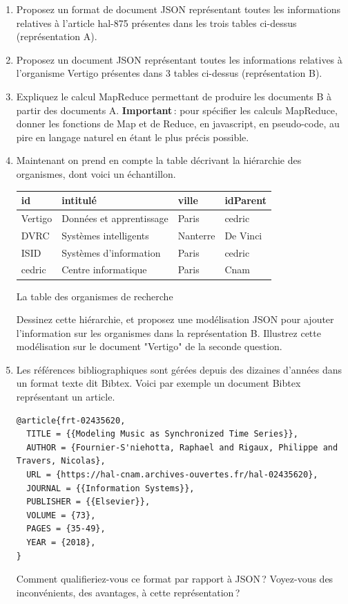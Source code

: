 \documentclass[11pt,a4paper]{article}
\newcommand{\cle}[1]{\textbf{#1}}
\begin{document}
\begin{enumerate}
  \item Proposez un format de document JSON représentant toutes les informations
        relatives à l'article hal-875 présentes dans les trois tables ci-dessus (représentation A).

  \item Proposez un document JSON représentant toutes les
        informations relatives à l'organisme Vertigo présentes dans 3 tables ci-dessus
         (représentation B).

   \item Expliquez le calcul MapReduce permettant de produire les documents
   B à partir des documents A.
   \textbf{Important}\,: pour spécifier les calculs MapReduce, donner les fonctions de Map et de Reduce, en javascript,
en pseudo-code, au pire en langage naturel en étant le plus précis possible.


   \item Maintenant on prend en compte la table décrivant la hiérarchie des organismes,
         dont voici un échantillon.
         \begin{center}
         \begin{tabular}{l|l|l|l}
\cle{id} & intitulé & ville & idParent\\
\hline
Vertigo & Données et apprentissage & Paris & cedric \\
DVRC & Systèmes intelligents & Nanterre & De Vinci \\
ISID & Systèmes d'information & Paris &  cedric\\
cedric & Centre informatique  & Paris &  Cnam\\
\hline
\end{tabular}
\centerline{La table des organismes de recherche}
\end{center}

   Dessinez cette hiérarchie, et proposez une modélisation JSON pour ajouter l'information
   sur les organismes dans la représentation B. Illustrez cette modélisation
   sur le document "Vertigo" de la seconde question.

     \item Les références bibliographiques sont gérées depuis des dizaines d'années dans
       un format texte dit Bibtex. Voici par exemple
       un document Bibtex représentant un article.

\begin{verbatim}
@article{frt-02435620,
  TITLE = {{Modeling Music as Synchronized Time Series}},
  AUTHOR = {Fournier-S'niehotta, Raphael and Rigaux, Philippe and Travers, Nicolas},
  URL = {https://hal-cnam.archives-ouvertes.fr/hal-02435620},
  JOURNAL = {{Information Systems}},
  PUBLISHER = {{Elsevier}},
  VOLUME = {73},
  PAGES = {35-49},
  YEAR = {2018},
}
\end{verbatim}

       Comment qualifieriez-vous ce format par rapport à JSON\,? Voyez-vous
        des inconvénients, des avantages, à cette représentation\,?

\end{enumerate}
\end{document}
